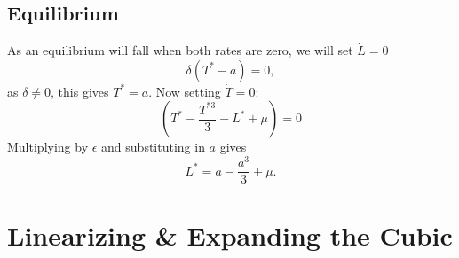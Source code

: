     \subsection{Equilibrium}
    As an equilibrium will fall when both rates are zero, we will set $\dot L =0$
    \[
    \delta(T^*-a)=0,
    \]
   as $\delta\neq0$, this gives $T^*=a$. Now setting $\dot T=0$:
   \[
   \left(T^*-\frac{T^{*3}}{3}-L^*+\mu\right)=0
   \]
   Multiplying by $\epsilon$ and substituting in $a$ gives
   \[
   L^*=a-\frac{a^3}{3}+\mu.
   \]
    
    

    \section{Linearizing \& Expanding the Cubic}\label{sec:linearizing}

